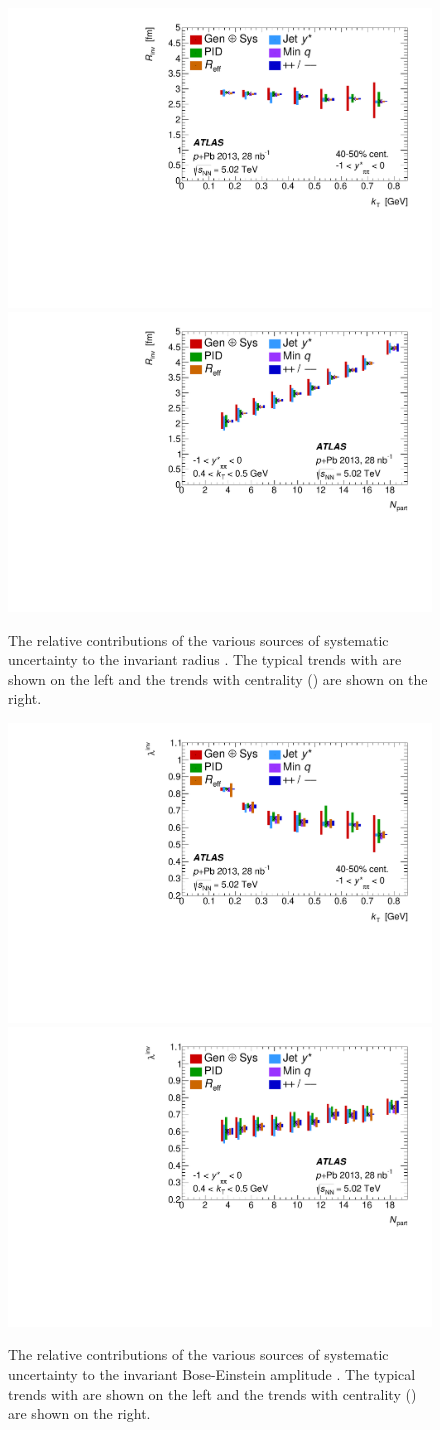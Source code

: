 \begin{figure}[t]
\centering
\includegraphics[width=0.49\linewidth]{canqinv_R_vs_kt_systs.pdf}
\includegraphics[width=0.49\linewidth]{canqinv_R_vs_npart_systs.pdf}\\
\caption{The relative contributions of the various sources of systematic uncertainty to the invariant radius \Rinv. The typical trends with \kt are shown on the left and the trends with centrality (\Npart) are shown on the right.}
\label{fig:syst_rinv}
\end{figure}

\begin{figure}[t]
\centering
\includegraphics[width=0.49\linewidth]{canqinv_x_vs_kt_systs.pdf}
\includegraphics[width=0.49\linewidth]{canqinv_x_vs_npart_systs.pdf}\\
\caption{The relative contributions of the various sources of systematic uncertainty to the invariant Bose-Einstein amplitude \linv. The typical trends with \kt are shown on the left and the trends with centrality (\Npart) are shown on the right.}
\label{fig:syst_linv}
\end{figure}

